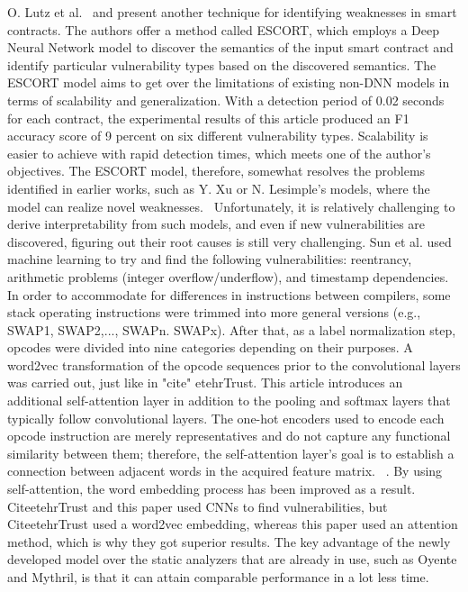 O. Lutz et al.~\cite{Dolan2016lava} and present another technique for identifying weaknesses in smart contracts.
The authors offer a method called ESCORT, which employs a Deep Neural Network model to discover the semantics of the input smart contract and identify particular vulnerability types based on the discovered semantics.
The ESCORT model aims to get over the limitations of existing non-DNN models in terms of scalability and generalization.
With a detection period of 0.02 seconds for each contract, the experimental results of this article produced an F1 accuracy score of 9 percent on six different vulnerability types.
Scalability is easier to achieve with rapid detection times, which meets one of the author's objectives.
The ESCORT model, therefore, somewhat resolves the problems identified in earlier works, such as Y. Xu or N. Lesimple's models, where the model can realize novel weaknesses.~\cite{grech2019gigahorse}
Unfortunately, it is relatively challenging to derive interpretability from such models, and even if new vulnerabilities are discovered, figuring out their root causes is still very challenging.
Sun et al. used machine learning to try and find the following vulnerabilities: reentrancy, arithmetic problems (integer overflow/underflow), and timestamp dependencies.
In order to accommodate for differences in instructions between compilers, some stack operating instructions were trimmed into more general versions (e.g., SWAP1, SWAP2,..., SWAPn. SWAPx).
After that, as a label normalization step, opcodes were divided into nine categories depending on their purposes.
A word2vec transformation of the opcode sequences prior to the convolutional layers was carried out, just like in "cite" etehrTrust.
This article introduces an additional self-attention layer in addition to the pooling and softmax layers that typically follow convolutional layers.
The one-hot encoders used to encode each opcode instruction are merely representatives and do not capture any functional similarity between them; therefore, the self-attention layer's goal is to establish a connection between adjacent words in the acquired feature matrix. ~\cite{grech2019gigahorse}.
By using self-attention, the word embedding process has been improved as a result.
CiteetehrTrust and this paper used CNNs to find vulnerabilities, but CiteetehrTrust used a word2vec embedding, whereas this paper used an attention method, which is why they got superior results. The key advantage of the newly developed model over the static analyzers that are already in use, such as Oyente and Mythril, is that it can attain comparable performance in a lot less time.
